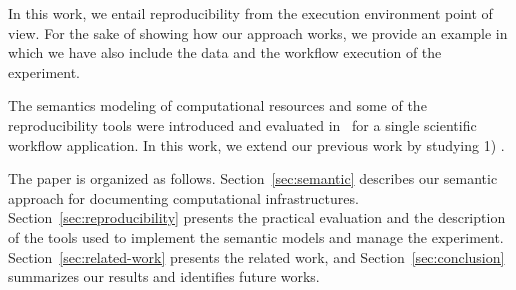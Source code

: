 In this work, we entail reproducibility from the execution environment point of view. For  the sake of showing how our approach works, we provide an example in which we have also include the data and the workflow execution of the experiment.

The semantics modeling of computational resources and some of the reproducibility tools 
were introduced and evaluated in~\cite{SantanaPerez-REPPAR-2014} for a single scientific 
workflow application. In this work, we extend our previous work by studying 1) .

The paper is organized as follows. Section~\ref{sec:semantic} describes our semantic approach for documenting computational infrastructures. Section~\ref{sec:reproducibility} presents the practical evaluation and the description of the tools used to implement the semantic models and manage the experiment. Section~\ref{sec:related-work} presents the related work, and Section~\ref{sec:conclusion} summarizes our results and identifies future works.
